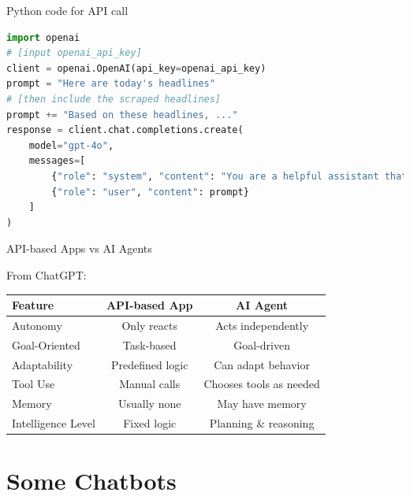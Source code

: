 \documentclass[10pt]{beamer}
\newcommand{\cmark}{\textcolor{green!70!black}{\ding{51}}} %
\newcommand{\xmark}{\textcolor{red}{\ding{55}}}             %
\begin{document}
\begin{frame}[fragile]{Python code for API call}
    \begin{lstlisting}[language=Python]
import openai
# [input openai_api_key]
client = openai.OpenAI(api_key=openai_api_key)
prompt = "Here are today's headlines"
# [then include the scraped headlines]
prompt += "Based on these headlines, ..."
response = client.chat.completions.create(
    model="gpt-4o",
    messages=[
        {"role": "system", "content": "You are a helpful assistant that analyzes news headlines."},
        {"role": "user", "content": prompt}
    ]
)
    \end{lstlisting}
\end{frame}

   

    \begin{frame}{API-based Apps vs AI Agents}

        From ChatGPT:

        \begin{table}[h!]
        \centering
        \renewcommand{\arraystretch}{1.3}
        \begin{tabular}{|l|c|c|}
        \hline
        \textbf{Feature} & \textbf{API-based App} & \textbf{AI Agent} \\
        \hline
        Autonomy & \xmark{} Only reacts & \cmark{} Acts independently \\
        Goal-Oriented & \xmark{} Task-based & \cmark{} Goal-driven \\
        Adaptability & \xmark{} Predefined logic & \cmark{} Can adapt behavior \\
        Tool Use & \cmark{} Manual calls & \cmark{} Chooses tools as needed \\
        Memory & \xmark{} Usually none & \cmark{} May have memory \\
        Intelligence Level & \xmark{} Fixed logic & \cmark{} Planning \& reasoning \\
        \hline
        \end{tabular}
        \end{table}

        
        \end{frame}

\section{Some Chatbots}
\end{document}
